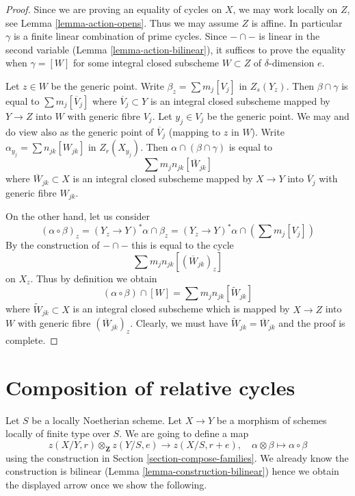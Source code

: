 \begin{proof}
Since we are proving an equality of cycles on $X$, we may work locally
on $Z$, see Lemma \ref{lemma-action-opens}. Thus we may assume $Z$
is affine. In particular $\gamma$ is a finite linear combination of prime
cycles. Since $- \cap -$ is linear in the second variable
(Lemma \ref{lemma-action-bilinear}), it suffices
to prove the equality when $\gamma = [W]$ for some integral closed subscheme
$W \subset Z$ of $\delta$-dimension $e$.

\medskip\noindent
Let $z \in W$ be the generic point. Write $\beta_z = \sum m_j[V_j]$
in $Z_s(Y_z)$. Then $\beta \cap \gamma$ is equal to $\sum m_j[\overline{V}_j]$
where $\overline{V}_j \subset Y$ is an integral closed subscheme
mapped by $Y \to Z$ into $W$ with generic fibre $V_j$.
Let $y_j \in V_j$ be the generic point. We may and do view
also as the generic point of $\overline{V}_j$ (mapping to $z$ in $W$).
Write $\alpha_{y_j} = \sum n_{jk} [W_{jk}]$ in $Z_r(X_{y_j})$.
Then $\alpha \cap (\beta \cap \gamma)$ is equal to
$$
\sum m_j n_{jk} [\overline{W}_{jk}]
$$
where $\overline{W}_{jk} \subset X$ is an integral closed subscheme
mapped by $X \to Y$ into $\overline{V}_j$ with generic fibre $W_{jk}$.

\medskip\noindent
On the other hand, let us consider
$$
(\alpha \circ \beta)_z = (Y_z \to Y)^*\alpha \cap \beta_z =
(Y_z \to Y)^*\alpha \cap (\sum m_j [V_j])
$$
By the construction of $- \cap -$ this is equal to the cycle
$$
\sum m_j n_{jk} [(\overline{W}_{jk})_z]
$$
on $X_z$. Thus by definition we obtain
$$
(\alpha \circ \beta) \cap [W] =
\sum m_j n_{jk} [\widetilde{W}_{jk}]
$$
where $\widetilde{W}_{jk} \subset X$ is an integral closed subscheme which
is mapped by $X \to Z$ into $W$ with generic fibre $(\overline{W}_{jk})_z$.
Clearly, we must have $\widetilde{W}_{jk} = \overline{W}_{jk}$
and the proof is complete.
\end{proof}









\section{Composition of relative cycles}
\label{section-compose}

\noindent
Let $S$ be a locally Noetherian scheme. Let $X \to Y$
be a morphism of schemes locally of finite type over $S$.
We are going to define a map
$$
z(X/Y, r) \otimes_\mathbf{Z} z(Y/S, e) \longrightarrow z(X/S, r + e),\quad
\alpha \otimes \beta \longmapsto \alpha \circ \beta
$$
using the construction in Section \ref{section-compose-families}.
We already know the construction is bilinear
(Lemma \ref{lemma-construction-bilinear})
hence we obtain the displayed arrow once we show the following.

